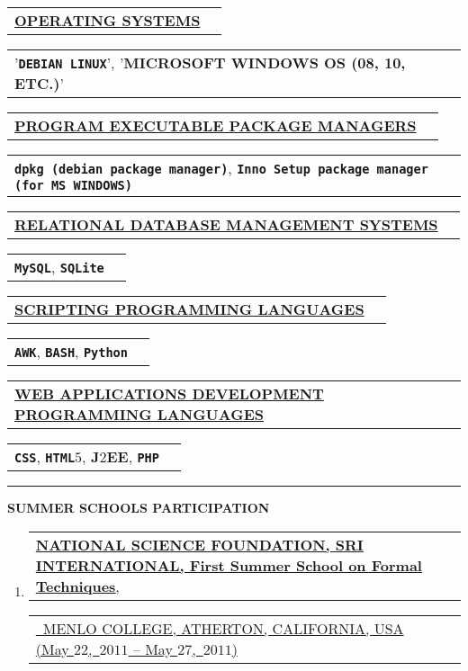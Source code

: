 \documentclass[9pt,a4paper]{article} %
\makeatletter
\newcommand{\headerrow}[2]
{\begin{tabular*}{\linewidth}{l@{\extracolsep{\fill}}r}
	#1 &
	#2 \\
\end{tabular*}}
\newcommand{\headerrowONE}[1]{\headerrow{#1}{}}
\newcommand{\css}{\texttt{CSS}\xspace}
\newcommand{\html}{\texttt{HTML$5$}\xspace}
\newcommand{\jtwoee}{J$2$EE\xspace}
\newcommand{\php}{\texttt{PHP}\xspace}
\newcommand{\dpkgmanager}{\texttt{dpkg (debian package manager)}\xspace}
\newcommand{\innosetuppackagemanager}{\texttt{Inno Setup package manager (for MS~WINDOWS)}\xspace}
\newcommand{\AWK}{\texttt{AWK}\xspace}
\newcommand{\bash}{\texttt{BASH}\xspace}
\newcommand{\python}{\texttt{Python}\xspace}
\newcommand{\mysql}{\texttt{MySQL}\xspace}
\newcommand{\sqlite}{\texttt{SQLite}\xspace}
\newcommand{\yerothdebian}{\texttt{DEBIAN LINUX}\xspace}
\newcommand{\cvitemdate}[2]{#1~$#2$\xspace}
\makeatother
\begin{document}
\vspace{0.3em}


\headerrowONE{\textbf{\underline{OPERATING SYSTEMS}}}
\headerrowONE{'\textbf{\yerothdebian}', '\textbf{MICROSOFT WINDOWS OS (08, 10, ETC.)}'}

\vspace{0.3em}

\headerrowONE{\textbf{\underline{PROGRAM EXECUTABLE PACKAGE MANAGERS}}}
\headerrowONE{\textbf{\dpkgmanager}, \textbf{\innosetuppackagemanager}}

\vspace{0.3em}

\headerrowONE{\textbf{\underline{RELATIONAL DATABASE MANAGEMENT SYSTEMS}}}
\headerrowONE{\textbf{\mysql}, \textbf{\sqlite}}

\vspace{0.3em}

\headerrowONE{\textbf{\underline{SCRIPTING PROGRAMMING LANGUAGES}}}
\headerrowONE{\textbf{\AWK}, \textbf{\bash}, \textbf{\python}}

\vspace{0.3em}

\headerrowONE{\textbf{\underline{WEB APPLICATIONS DEVELOPMENT PROGRAMMING LANGUAGES}}}
\headerrowONE{\textbf{\css}, \textbf{\html}, \textbf{\jtwoee}, \textbf{\php}}

\vspace{1em}

\hrule
\begin{center}
{\large \textbf{SUMMER SCHOOLS PARTICIPATION}}
\end{center}

\vspace{0.5em}

\begin{enumerate}
	\item \headerrowONE{\href{http://fm.csl.sri.com/SSFT11/}{\textbf{NATIONAL SCIENCE FOUNDATION, SRI INTERNATIONAL, First Summer School on Formal Techniques},}}
			\headerrowONE{\href{http://fm.csl.sri.com/SSFT11}{\ \hfill  MENLO COLLEGE, ATHERTON, 
			CALIFORNIA, USA (\cvitemdate{May $22$,}{2011} -- \cvitemdate{May $27$,}{2011})}}

\end{enumerate}

\vspace{1em}

\end{document}
